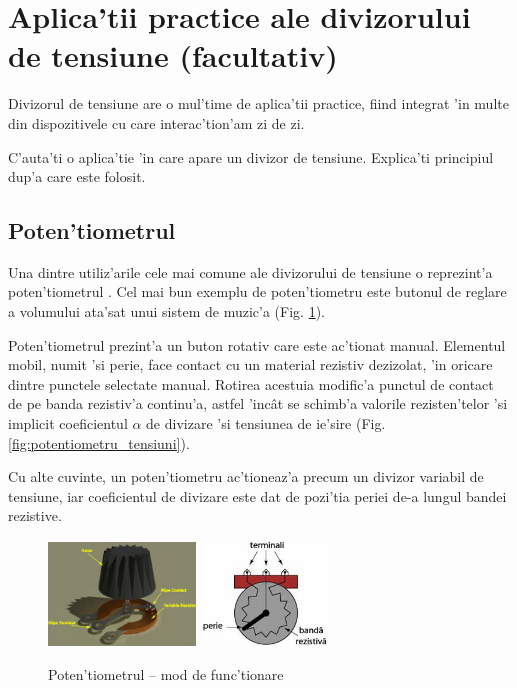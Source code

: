 \section[Aplica'tii practice ale divizorului de tensiune]{Aplica'tii practice ale divizorului de tensiune (facultativ)}

Divizorul de tensiune are o mul'time de aplica'tii practice, fiind integrat 'in multe din dispozitivele cu care interac'tion'am zi de zi.
\begin{exercise}
C'auta'ti o aplica'tie 'in care apare un divizor de tensiune. Explica'ti principiul dup'a care este folosit.
\end{exercise}

\subsection*{Poten'tiometrul}

Una dintre utiliz'arile cele mai comune ale divizorului de tensiune o reprezint'a poten'tiometrul \cite{aplicatii_potentiometru}. Cel mai bun exemplu de poten'tiometru este butonul de reglare a volumului ata'sat unui sistem de muzic'a (Fig. \ref{fig:potentiometru}). 

Poten'tiometrul prezint'a un buton rotativ care este ac'tionat manual. Elementul mobil, numit 'si perie, face contact cu un material rezistiv dezizolat, 'in oricare dintre punctele selectate manual. Rotirea acestuia modific'a punctul de contact de pe banda rezistiv'a continu'a, astfel 'inc\^at se schimb'a valorile rezisten'telor 'si implicit coeficientul $\alpha$ de divizare 'si tensiunea de ie'sire (Fig. \ref{fig:potentiometru_tensiuni}).

Cu alte cuvinte, un poten'tiometru ac'tioneaz'a precum un divizor variabil de tensiune, iar coeficientul de divizare este dat de pozi'tia periei de-a lungul bandei rezistive.

\begin{figure}[!b]
	\centering
		\includegraphics[width=0.35\textwidth]{laborator_01/figuri/6_potentiometru0}
		\includegraphics[width=0.3\textwidth]{laborator_01/figuri/6_potentiometru1}
	\caption{Poten'tiometrul -- mod de func'tionare} %
	\label{fig:potentiometru}
\end{figure}

